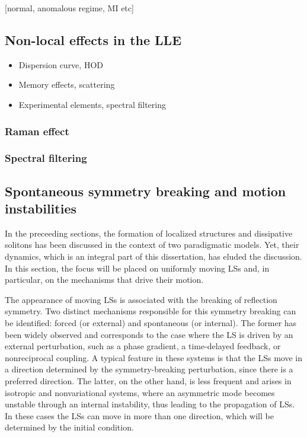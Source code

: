 [normal, anomalous regime, MI etc]

\subsection{Non-local effects in the LLE}

\begin{itemize}
    \item Dispersion curve, HOD
    \item Memory effects, scattering
    \item Experimental elements, spectral filtering
\end{itemize}

\subsubsection{Raman effect}
\subsubsection{Spectral filtering}


\subsection{Spontaneous symmetry breaking and motion instabilities}

In the preceeding sections, the formation of localized structures and dissipative solitons
has been discussed in the context of two paradigmatic models. Yet, their dynamics, which is
an integral part of this dissertation, has eluded the discussion. In this section, the focus
will be placed on uniformly moving LSs and, in particular, on the mechanisms that drive their motion.

The appearance of moving LSs is associated with the breaking of reflection symmetry. Two
distinct mechanisms responsible for this symmetry breaking can be identified: forced
(or external) and spontaneous (or internal). The former has been widely observed and 
corresponds to the case
where the LS is driven by an external perturbation, such as a phase gradient, a time-delayed
feedback, or nonreciprocal coupling. A typical feature in these systems is that the LSs
move in a direction determined by the symmetry-breaking perturbation, since there
is a preferred direction.
The latter, on the other hand, is less frequent and arises in isotropic and
nonvariational systems, where an asymmetric mode becomes unstable through an internal
instability, thus leading to the propagation of LSs. In these cases the LSs can move 
in more than one direction, which will be determined by the initial condition. 


